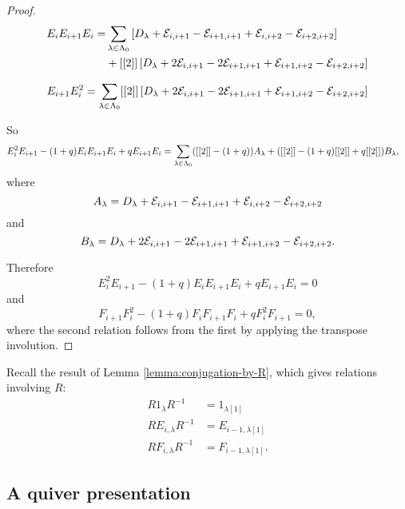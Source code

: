 \documentclass[a4paper, 11pt]{report}
\begin{document}
\begin{proof}
\begin{align*}
E_i E_{i+1} E_i = &\sum_{\lambda\in\Lambda_0{}} \left[D_\lambda +\mathcal{E}_{i,i+1} -\mathcal{E}_{i+1,i+1} +\mathcal{E}_{i,i+2} -\mathcal{E}_{i+2,i+2}\right]\\
&+[[2]]\left[D_\lambda +2\mathcal{E}_{i,i+1} -2\mathcal{E}_{i+1,i+1} +\mathcal{E}_{i+1,i+2} -\mathcal{E}_{i+2,i+2}\right]
\end{align*}

\begin{equation*}
E_{i+1}E_i^2 = \sum_{\lambda\in\Lambda_0{}} [[2]]\left[D_\lambda +2\mathcal{E}_{i,i+1} -2\mathcal{E}_{i+1,i+1} +\mathcal{E}_{i+1,i+2} -\mathcal{E}_{i+2,i+2}\right]
\end{equation*}

So
\begin{align*}
E_i^2E_{i+1} -(1+q)E_iE_{i+1}E_i +qE_{i+1}E_i &= \sum_{\lambda\in\Lambda_0{}} ([[2]] -(1+q))A_\lambda + ([[2]] -(1+q)[[2]] +q[[2]])B_\lambda,
\end{align*}
where
\begin{equation*}
A_\lambda = D_\lambda +\mathcal{E}_{i,i+1} -\mathcal{E}_{i+1,i+1} +\mathcal{E}_{i,i+2} -\mathcal{E}_{i+2,i+2}
\end{equation*}
and
\begin{equation*}
B_\lambda = D_\lambda +2\mathcal{E}_{i,i+1} -2\mathcal{E}_{i+1,i+1} +\mathcal{E}_{i+1,i+2} -\mathcal{E}_{i+2,i+2}.
\end{equation*}

Therefore
\begin{equation*}
E_i^2E_{i+1} -(1+q)E_iE_{i+1}E_i +qE_{i+1}E_i = 0
\end{equation*}
and
\begin{equation*}
F_{i+1}F_i^2 -(1+q)F_iF_{i+1}F_i +qF_i^2F_{i+1} = 0,
\end{equation*}
where the second relation follows from the first by applying the transpose involution.
\end{proof}

Recall the result of Lemma \ref{lemma:conjugation-by-R}, which gives relations involving $R$:
\begin{align*}
R1_\lambda R^{-1} &= 1_{\lambda[1]}\\
RE_{i,\lambda}R^{-1} &= E_{i-1,\lambda[1]}\\
RF_{i,\lambda}R^{-1} &= F_{i-1,\lambda[1]}.
\end{align*}


\subsection{A quiver presentation}
\end{document}
